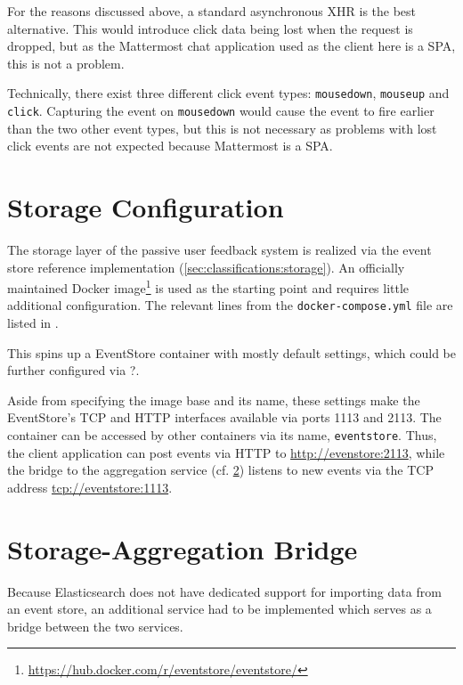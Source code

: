 For the reasons discussed above, a standard asynchronous \ac{XHR} is the best alternative.
This would introduce click data being lost when the request is dropped, but as the Mattermost chat application used as the client here is a \ac{SPA}, this is not a problem.

Technically, there exist three different click event types: \texttt{mousedown}, \texttt{mouseup} and \texttt{click}.
Capturing the event on \texttt{mousedown} would cause the event to fire earlier than the two other event types, but this is not necessary as problems with lost click events are not expected because Mattermost is a \ac{SPA}.

\section{Storage Configuration}
\label{sec:implementation:storage}

The storage layer of the passive user feedback system is realized via the event store reference implementation (\cref{sec:classifications:storage}).
An officially maintained Docker image\footnote{\url{https://hub.docker.com/r/eventstore/eventstore/}} is used as the starting point and requires little additional configuration.
The relevant lines from the \texttt{docker-compose.yml} file are listed in .


This spins up a EventStore container with mostly default settings, which could be further configured via ?.

Aside from specifying the image base and its name, these settings make the EventStore's TCP and HTTP interfaces available via ports 1113 and 2113.
The container can be accessed by other containers via its name, \texttt{eventstore}.
Thus, the client application can post events via HTTP to \url{http://evenstore:2113}, while the bridge to the aggregation service (cf. \cref{sec:implementation:bridge}) listens to new events via the TCP address \url{tcp://eventstore:1113}.

\section{Storage-Aggregation Bridge}
\label{sec:implementation:bridge}

Because Elasticsearch does not have dedicated support for importing data from an event store, an additional service had to be implemented which serves as a bridge between the two services.

